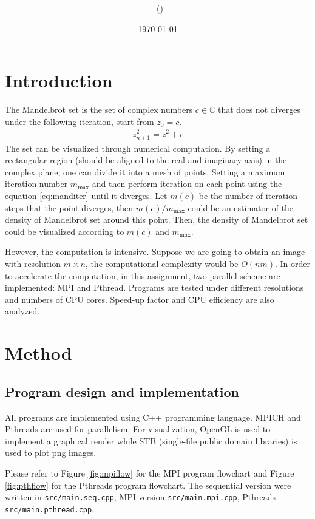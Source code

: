 \documentclass[twoside,12pt]{article}
\title{{\lms \Code \ \Ass}}
\author{\lms \name \ (\href{mailto:\mail}{\mail})}
\date{\sffamily \today}
\makeatletter
\theoremstyle{definition}
\theoremstyle{remark}
\renewcommand{\maketitle}{\bgroup\setlength{\parindent}{0pt}
\begin{flushleft}
  \textbf{\Large\@title}

  \@author
\end{flushleft}\egroup
}
\makeatother
\begin{document}
\maketitle
\thispagestyle{title}

\section{Introduction}
The Mandelbrot set is the set of complex numbers $c\in\mathbb{C}$ that does not diverges
under the following iteration, start from $z_0 = c$.
\begin{align}
    z_{n+1}^2 = z^2 + c
    \label{eq:manditer}
\end{align}
The set can be visualized through numerical computation.
By setting a rectangular region (should be aligned to the real and imaginary axis) 
in the complex plane, one can divide it into a mesh of points.
Setting a maximum iteration number $m_\text{max}$ and then perform iteration 
on each point using the equation \ref{eq:manditer} until it diverges.
Let $m(c)$ be the number of iteration steps that the point diverges, then
$m(c)/m_\text{max}$ could be an estimator of the density of Mandelbrot set
around this point.
Then, the density of Mandelbrot set could be visualized according to $m(c)$ and $m_\text{max}$.

However, the computation is intensive.
Suppose we are going to obtain an image with resolution $m\times n$,
the computational complexity would be $O(nm)$.
In order to accelerate the computation, in this assignment, two parallel scheme
are implemented: MPI and Pthread.
Programs are tested under different resolutions and numbers of CPU cores.
Speed-up factor and CPU efficiency are also analyzed.




\section{Method}
\subsection{Program design and implementation}
All programs are implemented using C++ programming language.
MPICH and Pthreads are used for parallelism.
For visualization, OpenGL is used to implement a graphical render
while STB (single-file public domain libraries) is used to plot png images.

Please refer to Figure \ref{fig:mpiflow} for the MPI program flowchart and
Figure \ref{fig:pthflow} for the Pthreads program flowchart.
The sequential version were written in \lstinline|src/main.seq.cpp|,
MPI version \lstinline|src/main.mpi.cpp|,
Pthreads \lstinline|src/main.pthread.cpp|.
\end{document}
